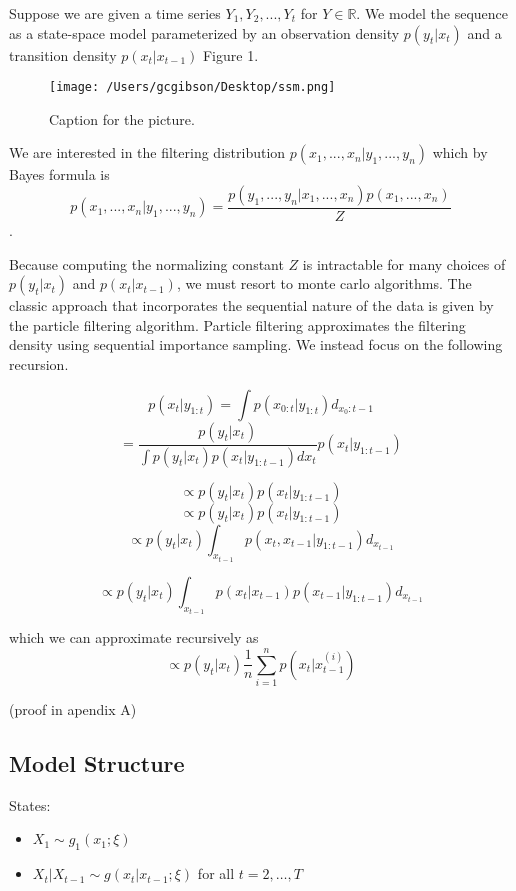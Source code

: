 \documentclass[]{article}
\begin{document}
Suppose we are given a time series \(Y_1,Y_2,...,Y_t\) for
\(Y \in \mathbb{R}\). We model the sequence as a state-space model
parameterized by an observation density \(p(y_t | x_t)\) and a
transition density \(p(x_t | x_{t-1})\) Figure 1.

\begin{figure}[htbp]
\centering
\texttt{[image: /Users/gcgibson/Desktop/ssm.png]}
\caption{Caption for the picture.}
\end{figure}

We are interested in the filtering distribution
\(p(x_1,...,x_n | y_1,...,y_n)\) which by Bayes formula is
\[p(x_1,...,x_n | y_1,...,y_n) = \frac{p(y_1,...,y_n | x_1,...,x_n) p(x_1,...,x_n)}{Z}\].

Because computing the normalizing constant \(Z\) is intractable for many
choices of \(p(y_t | x_t)\) and \(p(x_t | x_{t-1})\), we must resort to
monte carlo algorithms. The classic approach that incorporates the
sequential nature of the data is given by the particle filtering
algorithm. Particle filtering approximates the filtering density using
sequential importance sampling. We instead focus on the following
recursion.

\[p(x_t | y_{1:t}) = \int p(x_{0:t} | y_{1:t})d_{x_0:t-1}\]
\[=\frac{p(y_t | x_t)}{\int p(y_t|x_t)p(x_t | y_{1:t-1})dx_t}p(x_t | y_{1:t-1})\]

\[\propto p(y_t|x_t)p(x_t | y_{1:t-1})\]
\[\propto p(y_t|x_t)p(x_t | y_{1:t-1})\]
\[\propto p(y_t|x_t)\int_{x_{t-1}}p(x_t,x_{t-1} | y_{1:t-1})d_{x_{t-1}}\]

\[\propto p(y_t|x_t)\int_{x_{t-1}}p(x_t |x_{t-1} )p(x_{t-1}| y_{1:t-1})d_{x_{t-1}}\]

which we can approximate recursively as
\[\propto p(y_t|x_t) \frac{1}{n}\sum_{i=1}^n p(x_t | x_{t-1}^{(i)})\]

(proof in apendix A)

\subsection{Model Structure}\label{model-structure}

States:

\begin{itemize}
\item $X_1 \sim g_1(x_1 ; \xi)$
\item $X_t \vert X_{t-1} \sim g(x_t \vert x_{t - 1} ; \xi)$ for all $t = 2, \ldots, T$
\end{itemize}
\end{document}
